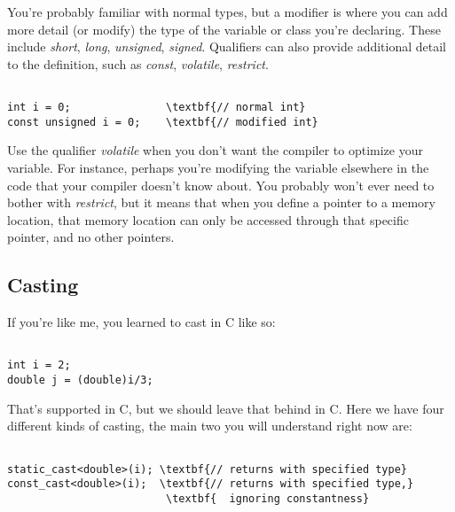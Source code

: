 \documentclass{IEEEtran}
\newcommand{\cpp}{C\nolinebreak\hspace{-.05em}\raisebox{.15ex}{\small\bf +}\nolinebreak\hspace{-.10em}\raisebox{.15ex}{\small\bf+\ }}
\begin{document}
You're probably familiar with normal types, but a modifier is where you can add more detail (or modify) the type of the variable or class you're declaring. These include \textit{short}, \textit{long}, \textit{unsigned}, \textit{signed}. Qualifiers can also provide additional detail to the definition, such as \textit{const}, \textit{volatile}, \textit{restrict}. 

\begin{Verbatim}[fontsize=\scriptsize, xleftmargin=.3in, commandchars=\\\{\}]

int i = 0;               \textbf{// normal int}
const unsigned i = 0;    \textbf{// modified int}

\end{Verbatim}

Use the qualifier \textit{volatile} when you don't want the compiler to optimize your variable. For instance, perhaps you're modifying the variable elsewhere in the code that your compiler doesn't know about. You probably won't ever need to bother with \textit{restrict}, but it means that when you define a pointer to a memory location, that memory location can only be accessed through that specific pointer, and no other pointers.

\subsection{Casting}

If you're like me, you learned to cast in C like so:

\begin{Verbatim}[fontsize=\scriptsize, xleftmargin=.3in, commandchars=\\\{\}]

int i = 2;              
double j = (double)i/3;   

\end{Verbatim}

That's supported in \cpp, but we should leave that behind in C. Here we have four different kinds of casting, the main two you will understand right now are:

\begin{Verbatim}[fontsize=\scriptsize, xleftmargin=.3in, commandchars=\\\{\}]

static_cast<double>(i); \textbf{// returns with specified type}        
const_cast<double>(i);  \textbf{// returns with specified type,}
                         \textbf{  ignoring constantness}     

\end{Verbatim}
\end{document}
